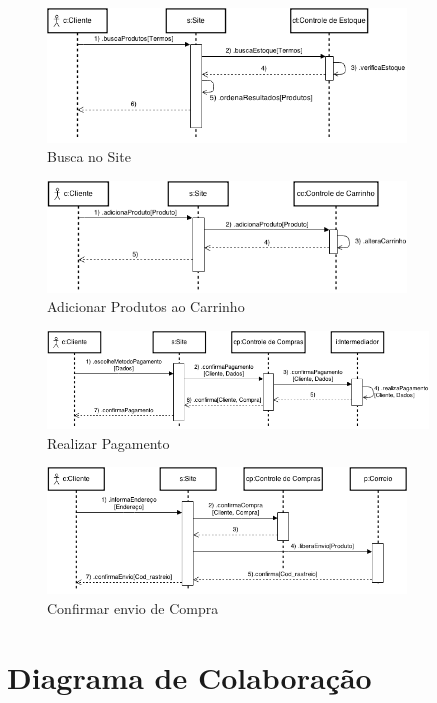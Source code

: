 \documentclass[12pt,a4paper]{article}
\begin{document}
\begin{figure}[h!]
\centering
\includegraphics[width=0.85\textwidth]{img/sequencia_busca}
\caption{Busca no Site}
\end{figure}
\begin{figure}[h!]
\centering
\includegraphics[width=0.85\textwidth]{img/sequencia_carrinho}
\caption{Adicionar Produtos ao Carrinho}
\end{figure}
\begin{figure}[h!]
\centering
\includegraphics[width=0.9\textwidth]{img/sequencia_pagamento}
\caption{Realizar Pagamento}
\end{figure}
\begin{figure}[h!]
\centering
\includegraphics[width=0.85\textwidth]{img/sequencia_envio}
\caption{Confirmar envio de Compra}
\end{figure}

\section{Diagrama de Colaboração}
\end{document}

